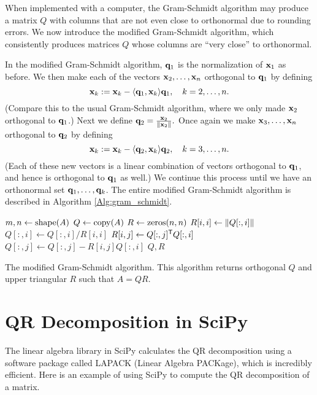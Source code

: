 When implemented with a computer, the Gram-Schmidt algorithm may produce a matrix $Q$ with columns that are not even close to orthonormal due to rounding errors. 
We now introduce the modified Gram-Schmidt algorithm, which consistently produces matrices $Q$ whose columns are ``very close'' to orthonormal.

In the modified Gram-Schmidt algorithm, ${\bf q}_1$ is the normalization of ${\bf x}_1$ as before. 
We then make each of the vectors ${\bf x}_2, \ldots, {\bf x}_n$ orthogonal to ${\bf q}_1$ by defining
\[
{\bf x}_k := {\bf x}_k - \langle {\bf q}_1,{\bf x}_{k} \rangle {\bf q}_1,\quad k=2,\ldots,n.
\]
(Compare this to the usual Gram-Schmidt algorithm, where we only made ${\bf x}_2$ orthogonal to ${\bf q}_1$.) 
Next we define ${\bf q}_2 = \frac{{\bf x}_2}{\|{\bf x}_2\|}.$ Once again we make ${\bf x}_3, \ldots, {\bf x}_n$ orthogonal to ${\bf q}_2$ by defining
\[
{\bf x}_k := {\bf x}_k - \langle {\bf q}_2,{\bf x}_{k} \rangle {\bf q}_2,\quad k=3,\ldots,n.
\]
(Each of these new vectors is a linear combination of vectors orthogonal to ${\bf q}_1$, and hence is orthogonal to ${\bf q}_1$ as well.) 
We continue this process until we have an orthonormal set ${\bf q}_1, \ldots, {\bf q}_k$. 
The entire modified Gram-Schmidt algorithm is described in Algorithm \ref{Alg:gram_schmidt}.

\begin{algorithm}
\begin{algorithmic}[1]
\State $m, n \gets \mathrm{shape}(A)$
\State $Q \gets \mathrm{copy}(A)$
\State $R \gets \zeros{n}{n}$
    \State $R[i,i] \gets \left\lVert Q[:,i]\right\rVert$
    \State $Q[:,i] \gets Q[:,i]/R[i,i]$
        \State $R[i,j] \gets Q[:,j]^{\mathsf T}  Q[:,i]$
        \State $Q[:,j] \gets Q[:,j]-R[i,j]Q[:,i]$
	\EndFor
\EndFor
\State {} $Q, R$
\EndProcedure
\end{algorithmic}
\caption{The modified Gram-Schmidt algorithm. This algorithm returns orthogonal $Q$ and upper triangular $R$ such that $A = QR$.}
\label{Alg:gram_schmidt}
\end{algorithm}


\section*{QR Decomposition in SciPy}
The linear algebra library in SciPy calculates the QR decomposition using a software package called LAPACK (Linear Algebra PACKage), which is incredibly efficient.
Here is an example of using SciPy to compute the QR decomposition of a matrix.

